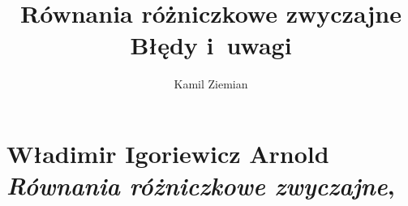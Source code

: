 \documentclass[a4paper,11pt]{article}
\title{Równania różniczkowe zwyczajne \\
  {\Large Błędy i~uwagi}}
\author{Kamil Ziemian}
\numberwithin{equation}{section}
\begin{document}





\maketitle %





\section{
  Władimir Igoriewicz Arnold \\
  \textit{Równania różniczkowe zwyczajne},
  \cite{ArnoldRownaniaRozniczkoweZwyczajne1975}}


\newpage

\end{document}
